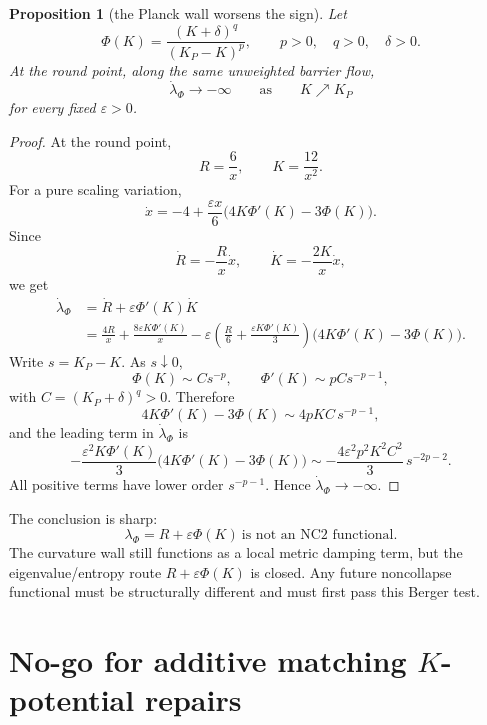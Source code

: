 \documentclass[11pt]{amsart}
\newtheorem{proposition}{Proposition}
\newcommand{\KP}{K_{\!P}}
\begin{document}
\begin{proposition}[the Planck wall worsens the sign]
Let
\[
        \Phi(K)=\frac{(K+\delta)^q}{(\KP-K)^p},
        \qquad p>0,\quad q>0,\quad \delta>0 .
\]
At the round point, along the same unweighted barrier flow,
\[
        \dot\lambda_\Phi\longrightarrow -\infty
        \qquad\text{as}\qquad K\nearrow\KP
\]
for every fixed \(\varepsilon>0\).
\end{proposition}

\begin{proof}
At the round point,
\[
        R=\frac6x,\qquad K=\frac{12}{x^2}.
\]
For a pure scaling variation,
\[
        \dot x
        =
        -4
        +
        \frac{\varepsilon x}{6}
        \bigl(4K\Phi'(K)-3\Phi(K)\bigr).
\]
Since
\[
        \dot R=-\frac{R}{x}\dot x,\qquad
        \dot K=-\frac{2K}{x}\dot x,
\]
we get
\[
\begin{aligned}
        \dot\lambda_\Phi
        &=
        \dot R+\varepsilon\Phi'(K)\dot K                                      \\
        &=
        \frac{4R}{x}
        +
        \frac{8\varepsilon K\Phi'(K)}{x}
        -
        \varepsilon
        \left(
        \frac{R}{6}
        +
        \frac{\varepsilon K\Phi'(K)}{3}
        \right)
        \bigl(4K\Phi'(K)-3\Phi(K)\bigr).
\end{aligned}
\]
Write \(s=\KP-K\).  As \(s\downarrow0\),
\[
        \Phi(K)\sim C s^{-p},\qquad
        \Phi'(K)\sim pC s^{-p-1},
\]
with \(C=(\KP+\delta)^q>0\).  Therefore
\[
        4K\Phi'(K)-3\Phi(K)\sim 4pKC\,s^{-p-1},
\]
and the leading term in \(\dot\lambda_\Phi\) is
\[
        -\frac{\varepsilon^2K\Phi'(K)}{3}
        \bigl(4K\Phi'(K)-3\Phi(K)\bigr)
        \sim
        -\frac{4\varepsilon^2p^2K^2C^2}{3}\,s^{-2p-2}.
\]
All positive terms have lower order \(s^{-p-1}\).  Hence
\(\dot\lambda_\Phi\to-\infty\).
\end{proof}

The conclusion is sharp:
\[
        \boxed{\lambda_\Phi=R+\varepsilon\Phi(K)\ \text{is not an NC2 functional}.}
\]
The curvature wall still functions as a local metric damping term, but the
eigenvalue/entropy route \(R+\varepsilon\Phi(K)\) is closed.  Any future
noncollapse functional must be structurally different and must first pass this
Berger test.


\section{No-go for additive matching \texorpdfstring{\(K\)}{K}-potential repairs}
\end{document}
